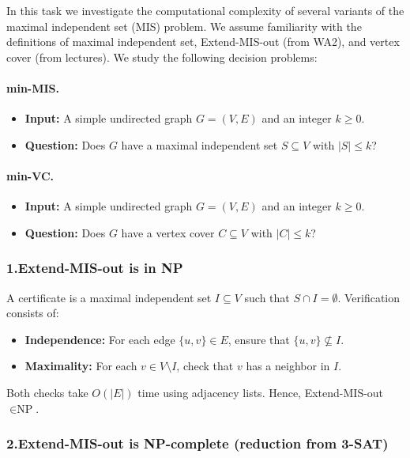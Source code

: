 \documentclass[9pt]{extarticle}
\begin{document}
In this task we investigate the computational complexity of several variants of 
the maximal independent set (MIS) problem.  
We assume familiarity with the definitions of maximal independent set, 
Extend-MIS-out (from WA2), and vertex cover (from lectures).  
We study the following decision problems:

\paragraph{min-MIS.}
\begin{itemize}
    \item \textbf{Input:} A simple undirected graph $G=(V,E)$ and an integer $k\ge 0$.
    \item \textbf{Question:} Does $G$ have a maximal independent set $S\subseteq V$ with $|S|\le k$?
\end{itemize}

\paragraph{min-VC.}
\begin{itemize}
    \item \textbf{Input:} A simple undirected graph $G=(V,E)$ and an integer $k\ge 0$.
    \item \textbf{Question:} Does $G$ have a vertex cover $C\subseteq V$ with $|C|\le k$?
\end{itemize}

\subsubsection*{1.\quad Extend-MIS-out is in NP}

A certificate is a maximal independent set $I\subseteq V$ such that $S\cap I=\emptyset$.
Verification consists of:

\begin{itemize}
    \item \textbf{Independence:} For each edge $\{u,v\}\in E$, ensure that $\{u,v\}\nsubseteq I$.
    \item \textbf{Maximality:} For each $v\in V\setminus I$, check that $v$ has a neighbor in $I$.
\end{itemize}

Both checks take $O(|E|)$ time using adjacency lists.  
Hence, Extend-MIS-out $\in \text{NP}$.

\subsubsection*{2.\quad Extend-MIS-out is NP-complete (reduction from 3-SAT)}
\end{document}
